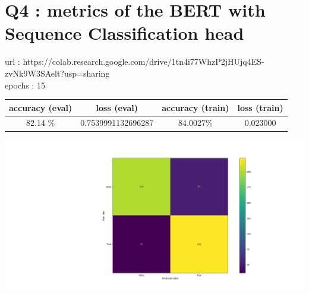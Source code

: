 \documentclass[11pt]{article}
\begin{document}
\section {Q4 : metrics of the BERT with Sequence Classification head}
url : https://colab.research.google.com/drive/1tn4i77WhzP2jHUjq4ES-zvNk9W3SAelt?usp=sharing\\
epochs : 15
\begin{center}
\begin{tabular}{ |c|c|c|c| } 
 \hline
	accuracy (eval) & loss (eval) & accuracy (train) & loss (train) \\ 
 \hline
	 82.14 \% & 0.7539991132696287 & 84.0027\% &  0.023000 \\ 
 \hline
\end{tabular}
\end{center}
\begin {center}
	\includegraphics[width=\textwidth]{bert_cm}
\end {center}
\end{document}
